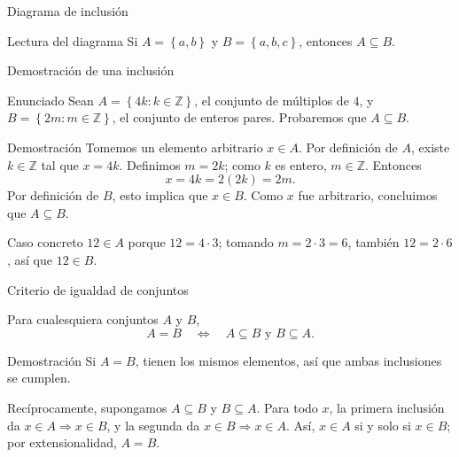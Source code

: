 \documentclass[aspectratio=169,11pt]{beamer}
\newcommand{\ZZ}{\mathbb{Z}}
\newcommand{\Set}[1]{\left\{#1\right\}}
\begin{document}
\begin{frame}{Diagrama de inclusión}
    \centering
    
    \begin{exampleblock}{Lectura del diagrama}
        Si $A=\Set{a,b}$ y $B=\Set{a,b,c}$, entonces $A\subseteq B$.
    \end{exampleblock}
\end{frame}

\begin{frame}{Demostración de una inclusión}
    \begin{block}{Enunciado}
        Sean $A=\Set{4k:k\in\ZZ}$, el conjunto de múltiplos de $4$, y $B=\Set{2m:m\in\ZZ}$, el conjunto de enteros pares. Probaremos que $A\subseteq B$.
    \end{block}
    \begin{block}{Demostración}
        Tomemos un elemento arbitrario $x\in A$. Por definición de $A$, existe $k\in\ZZ$ tal que $x=4k$. Definimos $m=2k$; como $k$ es entero, $m\in\ZZ$. Entonces
        \[
          x=4k=2(2k)=2m.
        \]
        Por definición de $B$, esto implica que $x\in B$. Como $x$ fue arbitrario, concluimos que $A\subseteq B$.
    \end{block}
    \begin{exampleblock}{Caso concreto}
        $12\in A$ porque $12=4\cdot3$; tomando $m=2\cdot3=6$, también $12=2\cdot6$, así que $12\in B$.
    \end{exampleblock}
\end{frame}

\begin{frame}{Criterio de igualdad de conjuntos}
    \begin{theorem}
        Para cualesquiera conjuntos $A$ y $B$,
        \[
          A=B\quad\Longleftrightarrow\quad A\subseteq B\text{ y }B\subseteq A.
        \]
    \end{theorem}
    \begin{block}{Demostración}
        Si $A=B$, tienen los mismos elementos, así que ambas inclusiones se cumplen.

        Recíprocamente, supongamos $A\subseteq B$ y $B\subseteq A$. Para todo $x$, la primera inclusión da $x\in A\Rightarrow x\in B$, y la segunda da $x\in B\Rightarrow x\in A$. Así, $x\in A$ si y solo si $x\in B$; por extensionalidad, $A=B$.
    \end{block}
\end{frame}
\end{document}
